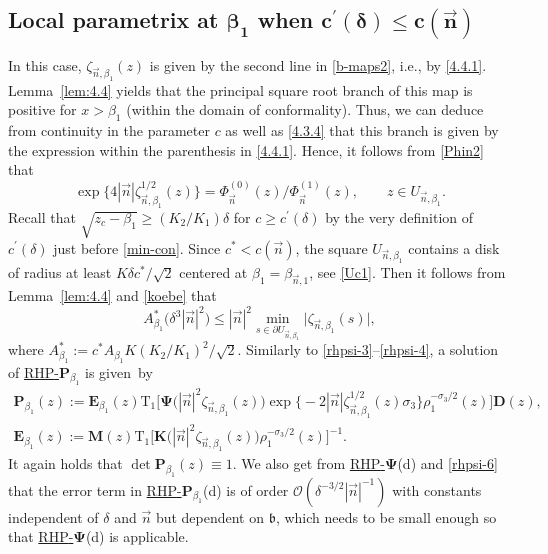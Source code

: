 \documentclass[10pt,a4paper]{amsart}
\numberwithin{equation}{section}
\renewcommand{\det}{\operatorname{det}}
\newcommand{\n}{{\vec n}}
\newcommand{\rhp} {\textnormal{RHP}-${\boldsymbol P}$}
\newcommand{\rhpsi} {\textnormal{RHP}-${\boldsymbol \Psi}$}
\begin{document}
\subsection[Local parametrix at beta\_1 when c]{Local parametrix at $\boldsymbol{\beta_1} $ when $\boldsymbol{c^\prime(\delta)\leq c(\n)} $}

In this case, $ \zeta_{\n,\beta_1}(z) $ is given by the second line in \eqref{b-maps2}, i.e., by \eqref{4.4.1}. Lemma~\ref{lem:4.4} yields that the principal square root branch of this map is positive for $ x>\beta_1 $ (within the domain of conformality). Thus, we can deduce from continuity in the parameter $ c $ as well as \eqref{4.3.4} that this branch is given by the expression within the parenthesis in \eqref{4.4.1}. Hence, it follows from \eqref{Phin2} that
\[
\exp\bigl\{4|\n|\zeta_{\n,\beta_1}^{1/2}(z) \bigr\} = \Phi_\n^{(0)}(z)/\Phi_\n^{(1)}(z), \qquad z\in U_{\n,\beta_1}.
\]
Recall that $ \sqrt{z_c-\beta_1} \geq (K_2/K_1)\delta $ for $ c\geq c^\prime(\delta) $ by the very definition of $ c^\prime(\delta) $ just before \eqref{min-con}. Since $ c^*<c(\n) $, the square $ U_{\n,\beta_1} $ contains a disk of radius at least $ K\delta c^*/\sqrt 2 $ centered at $ \beta_1=\beta_{\n,1} $, see \eqref{Uc1}. Then it follows from Lemma~\ref{lem:4.4} and \eqref{koebe} that
\begin{equation}
\label{rhpsi-6}
A_{\beta_1}^* \bigl( \delta^3 |\n|^2\bigr) \leq |\n|^2 \min_{s\in\partial U_{\n,\beta_1}} \big|\zeta_{\n,\beta_1}(s)\big|,
\end{equation}
where $ A_{\beta_1}^* := c^*A_{\beta_1} K (K_2/K_1)^2/\sqrt2 $. Similarly to \eqref{rhpsi-3}--\eqref{rhpsi-4}, a solution of \hyperref[rhp]{\rhp$_{\beta_1}$} is given~by
\begin{gather*}
\boldsymbol P_{\beta_1}(z) := \boldsymbol E_{\beta_1}(z) \mathrm{T}_1\big[ \boldsymbol\Psi\bigl(|\n|^2\zeta_{\n,\beta_1}(z)\bigr) \exp\bigl\{-2|\n|\zeta_{\n,\beta_1}^{1/2}(z)\sigma_3 \bigr\} \rho_1^{-\sigma_3/2}(z) \big] \boldsymbol D(z), \\
\boldsymbol E_{\beta_1}(z) := \boldsymbol M(z)\mathrm{T}_1\big[ \boldsymbol K \bigl(|\n|^2\zeta_{\n,\beta_1}(z)\bigr) \rho_1^{-\sigma_3/2}(z)\big]^{-1}.
\end{gather*}
It again holds that $ \det \boldsymbol P_{\beta_1}(z) \equiv 1 $. We also get from \hyperref[rhpsi]{\rhpsi}(d) and \eqref{rhpsi-6} that the error term in \hyperref[rhp]{\rhp$_{\beta_1}$}(d) is of order $ \boldsymbol{\mathcal O}\left(\delta^{-3/2} |\n|^{-1} \right) $ with constants independent of $ \delta $ and $ \n $ but dependent on $ \mathfrak b $, which needs to be small enough so that \hyperref[rhpsi]{\rhpsi}(d) is applicable.
\end{document}
